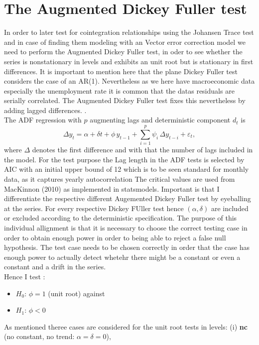 \documentclass[12pt,a4paper]{article}
\begin{document}
\section{The Augmented Dickey Fuller test}
In order to later test for cointegration relationships using the Johansen Trace test and in case of finding them modeling with an Vector error correction model we need to perform the Augmented Dickey Fuller test, in oder to see whether the series is nonstationary in levels and exhibits an unit root but is stationary in first differences.
It is important to mention here that the plane Dickey Fuller test considers the case of an AR(1). Nevertheless as we here have macroeconomic data especially the unemployment rate it is common that the datas residuals are serially correlated. The Augmented Dickey Fuller test fixes this nevertheless by adding lagged differences. 
.\\
The ADF regression with $p$ augmenting lags and deterministic component $d_t$ is
\begin{equation}
\Delta y_t = \alpha + \delta t + \phi\, y_{t-1}
            + \sum_{i=1}^{p}\psi_i\, \Delta y_{t-i} + \varepsilon_t,
\label{eq:adf}
\end{equation}
where $\Delta$ denotes the first difference and with that the number of lags included in the model. 
For the test purpose the Lag length in the ADF tests is selected by AIC with an initial upper bound of 12 which is to be seen standard for monthly data, as it captures yearly autocorrelation
The critical values are used from MacKinnon (2010) as implemented in statsmodels.
Important is that I differentiate the respective different Augemented Dickey Fuller test by eyeballing at the series. For every respective Dickey FUller test hence $(\alpha,\delta)$ are included or excluded according
to the deterministic specification. The purpose of this individual allignment is that it is necessary to choose the correct testing case in order to obtain enough power in order to being able to reject a false null hypothesis. The test case needs to be chosen correctly in order that the case has enough power to actually detect whetehr there might be a constant or even a constant and a drift in the series.\\
Hence I test : 
\begin{itemize}
    \item $H_0\!:\, \phi = 1$ (unit root) against 
    \item $H_1\!:\, \phi < 0$
\end{itemize}
As mentioned theree cases are considered for the unit root tests in levels: (i) \textbf{nc} (no constant, no trend: $\alpha=\delta=0$),
\end{document}
